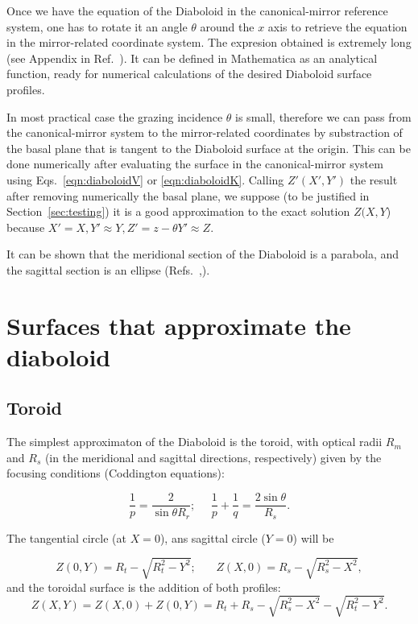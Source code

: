 \documentclass{iucr}              %
\begin{document}
Once we have the equation of the Diaboloid in the canonical-mirror reference system, one has to rotate it an angle $\theta$ around the $x$ axis to retrieve the equation in the mirror-related coordinate system. The expresion obtained is extremely long (see Appendix in Ref.~\cite{Valeriy2020b}). It can be defined in Mathematica as an analytical function, ready for numerical calculations of the desired Diaboloid surface profiles.

In most practical case the grazing incidence $\theta$ is small, therefore we can pass from the canonical-mirror system to the mirror-related coordinates by substraction of the basal plane that is tangent to the Diaboloid surface at the origin. This can be done numerically after evaluating the surface in the canonical-mirror system using Eqs.~\ref{eqn:diaboloidV} or \ref{eqn:diaboloidK}. Calling $Z'(X',Y')$ the result after removing numerically the basal plane, we suppose (to be justified in Section~\ref{sec:testing}) it is a good approximation to the exact solution $Z(X,Y$) because $X'=X, Y'\approx Y, Z'=z - \theta Y' \approx Z$. 

It can be shown that the meridional section of the Diaboloid is a parabola, and the sagittal section is an ellipse (Refs.~\cite{Goldberg2020},\cite{Valeriy2020a}).

\section{Surfaces that approximate the diaboloid}
\label{sec:approximations}

\subsection{Toroid}
The simplest approximaton of the Diaboloid is the toroid, with optical radii $R_m$ and $R_s$ (in the meridional and sagittal directions, respectively) given by the focusing conditions (Coddington equations): 

\begin{equation}
\label{eqn:radii}
\frac{1}{p} = \frac{2 }{\sin\theta R_r};~~~~~~
\frac{1}{p} + \frac{1}{q} = \frac{2\sin\theta}{ R_s}.
\end{equation}

The tangential circle (at $X=0$), ans sagittal circle ($Y=0$) will be

\begin{equation}
\label{eqn:toroidTS}
Z(0,Y) = R_t - \sqrt{R_t^2 - Y^2};~~~~~~~~
Z(X,0) = R_s - \sqrt{R_s^2 - X^2},
\end{equation}
and the toroidal surface is the addition of both profiles: 
\begin{equation}
\label{eqn:toroid}
Z(X,Y) = Z(X,0) + Z(0,Y) = 
R_t + R_s - \sqrt{R_s^2 - X^2}
- \sqrt{R_t^2 - Y^2}.
\end{equation}
\end{document}
